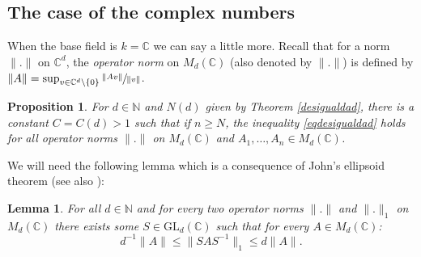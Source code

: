 \documentclass[11pt]{article}
\theoremstyle{plain}
\newtheorem{prop}[teo]{Proposition}
\newtheorem{lema}[teo]{Lemma}
\theoremstyle{definition}
\newcommand{\NN}{\mathbb{N}}
\newcommand{\CC}{\mathbb{C}}
\begin{document}
\subsection{The case of the complex numbers}\label{casoc} When the base field is $k=\CC$ we can say a little more. Recall that for a norm $\|.\|$ on $\CC^{d}$, the \textit{operator norm} on $M_{d}(\CC)$ (also denoted by $\|.\|$) is defined by $\|A\|=\sup_{v\in \CC^{d}\backslash \{ 0\}}{\sfrac{\|Av\|}{\|v\|}}$.
\begin{prop}\label{independ} For $d\in \NN$ and $N(d)$ given by Theorem \ref{desigualdad}, there is a constant $C=C(d)>1$ such that if $n\geq N$, the inequality \eqref{eqdesigualdad} holds for all operator norms $\|.\|$ on $M_{d}(\CC)$ and $A_1,\dots,A_n\in M_{d}(\CC)$.
\end{prop}
We will need the following lemma which is a consequence of John's ellipsoid theorem \cite[Th.\,10.12.2]{schr} (see also \cite[Lem.\,3.2]{bociineq}):
\begin{lema}\label{lemadeljairo}
For all $d\in \NN$ and for every two operator norms $\|.\|$ and $\|.\|_{1}$ on $M_{d}(\CC)$ there exists some $S\in\mathrm{GL}_{d}(\CC)$ such that for every $A \in M_{d}(\CC)$:
\begin{equation*}\label{kk}
d^{-1}\|A\|\leq\|SAS^{-1}\|_{1}\leq d\|A\|.
\end{equation*}
\end{lema}
\end{document}
